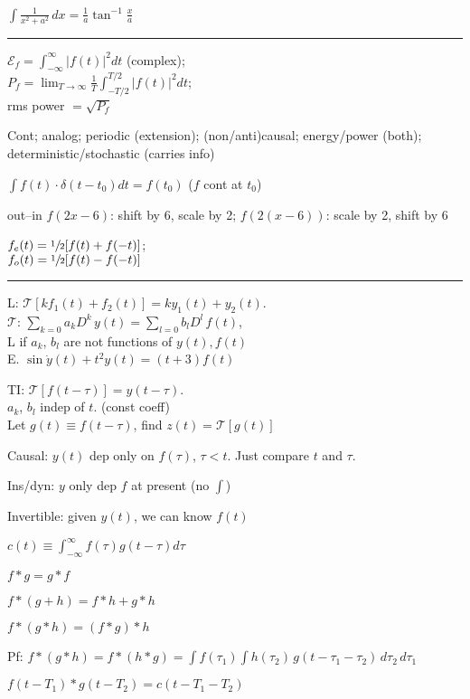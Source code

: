 \documentclass[4pt]{article}
\theoremstyle{definition}
\theoremstyle{definition}
\newcommand{\ra}{\rightarrow}
\begin{document}
    \(\int \frac{1} {x^2+a^2}\, dx = \frac{1}{a} \tan^{-1} \frac x a\)
    \rule{\linewidth}{0.5pt}
    $\mathcal{E}_f = \int_{-\infty}^{\infty} |f(t)|^2 dt$ (complex); \\
    $P_f = \lim_{T\ra\infty}\frac{1}{T} \int^{T/2}_{-T/2} |f(t)|^2 dt $; \\
    rms power $= \sqrt {P_f}$

    Cont; 
    analog; 
    periodic (extension); 
    (non/anti)causal; 
    energy/power (both); 
    deterministic/stochastic (carries info)

    $\int f(t)\cdot \delta(t - t_0) dt = f(t_0)$ ($f$ cont at $t_0$)
    

    out--in  $f(2x-6)$: shift by 6, scale by 2; $f(2(x-6))$: scale by 2, shift by 6

    $f_e(t) = \sfrac{1}{2}[f(t) + f(-t)]$; \\
    $f_o(t) = \sfrac{1}{2}[f(t) - f(-t)]$
\rule{\linewidth}{0.5pt}
    L: $\mathcal{T}[kf_1(t) + f_2(t)] = ky_1(t) + y_2(t)$.\\
    $\mathcal{T}$: $\sum_{k=0}a_k D^k \, y(t) = \sum_{l=0}b_lD^l\, f(t)$,\\
    L if $a_k$, $b_l$ are not functions of $y(t), f(t)$\\
    E. $\sin\dot{y}(t) + t^2 y(t) = (t+3) f(t)$
    
    TI: $\mathcal{T}[f(t-\tau)] = y(t-\tau)$.\\
    $a_k$, $b_l$ indep of $t$. (const coeff)\\
    Let $g(t)\equiv f(t-\tau)$, find $z(t) = \mathcal{T}[g(t)]$


    Causal: $y(t)$ dep only on $f(\tau)$, $\tau < t$. 
    Just compare $t$ and $\tau$.
    
    Ins/dyn: $y$ only dep $f$ at present (no $\int$)
    
    Invertible: given $y(t)$, we can know $f(t)$

    $c(t) \equiv \int_{-\infty}^{\infty} f(\tau) g(t-\tau) d\tau$

    $f * g = g * f$
    
    $f * (g + h) = f * h + g * h$
    
    $f * (g * h) = (f * g) * h$

        Pf: $f * (g * h) = f * (h * g) = \int f(\tau_1) \int h(\tau_2)\, g(t - \tau_1 - \tau_2) \, d\tau_2 \, d\tau_1$
    
     $f(t - T_1) * g(t - T_2) = c(t - T_1 - T_2)$
\end{document}
